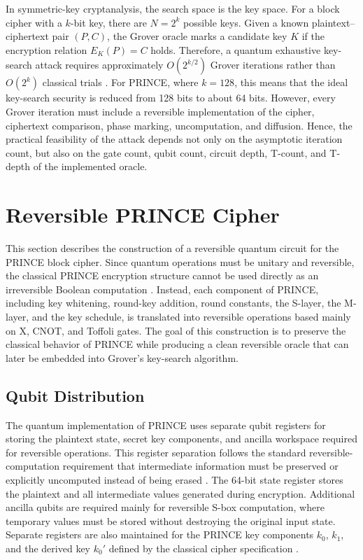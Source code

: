 \documentclass[11pt,a4paper]{article}
\begin{document}
In symmetric-key cryptanalysis, the search space is the key space. For a block cipher with a $k$-bit key, there are $N=2^k$ possible keys. Given a known plaintext--ciphertext pair $(P,C)$, the Grover oracle marks a candidate key $K$ if the encryption relation $E_K(P)=C$ holds. Therefore, a quantum exhaustive key-search attack requires approximately $O(2^{k/2})$ Grover iterations rather than $O(2^k)$ classical trials \cite{grassl2016applying,kim2018timespace}. For PRINCE, where $k=128$, this means that the ideal key-search security is reduced from 128 bits to about 64 bits. However, every Grover iteration must include a reversible implementation of the cipher, ciphertext comparison, phase marking, uncomputation, and diffusion. Hence, the practical feasibility of the attack depends not only on the asymptotic iteration count, but also on the gate count, qubit count, circuit depth, T-count, and T-depth of the implemented oracle.

\section{Reversible PRINCE Cipher}

This section describes the construction of a reversible quantum circuit for the PRINCE block cipher. Since quantum operations must be unitary and reversible, the classical PRINCE encryption structure cannot be used directly as an irreversible Boolean computation \cite{nielsen2010quantum}. Instead, each component of PRINCE, including key whitening, round-key addition, round constants, the S-layer, the M-layer, and the key schedule, is translated into reversible operations based mainly on X, CNOT, and Toffoli gates. The goal of this construction is to preserve the classical behavior of PRINCE \cite{borghoff2012prince} while producing a clean reversible oracle that can later be embedded into Grover's key-search algorithm.

\subsection{Qubit Distribution}

The quantum implementation of PRINCE uses separate qubit registers for storing the plaintext state, secret key components, and ancilla workspace required for reversible operations. This register separation follows the standard reversible-computation requirement that intermediate information must be preserved or explicitly uncomputed instead of being erased \cite{bennett1973logical,nielsen2010quantum}. The 64-bit state register stores the plaintext and all intermediate values generated during encryption. Additional ancilla qubits are required mainly for reversible S-box computation, where temporary values must be stored without destroying the original input state. Separate registers are also maintained for the PRINCE key components $k_0$, $k_1$, and the derived key $k_0'$ defined by the classical cipher specification \cite{borghoff2012prince}.
\end{document}
